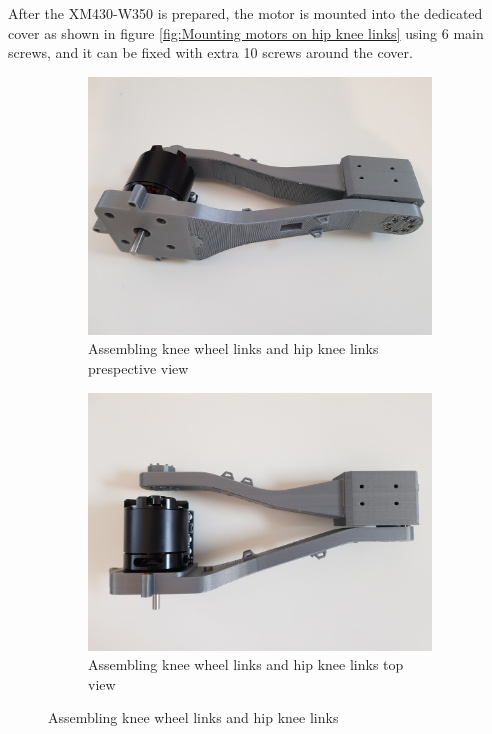 After the XM430-W350 is prepared, the motor is mounted into the dedicated cover as shown in figure \ref{fig:Mounting motors on hip knee links} using 6 main screws, and it can be fixed with extra 10 screws around the cover.
\begin{figure}[h]
	\centering
	\begin{subfigure}[t]{0.45\textwidth}
		\includegraphics[height=0.7\textwidth]{assembling_knee_wheel_links_and_hip_knee_links_1}
		\caption{Assembling knee wheel links and hip knee links	prespective view}
		\label{fig:assemblingkneewheellinksandhipkneelinksprespectiveview}
	\end{subfigure}
	\begin{subfigure}[t]{0.45\textwidth}
		\includegraphics[height=0.7\textwidth]{assembling_knee_wheel_links_and_hip_knee_links_2}
		\caption{Assembling knee wheel links and hip knee links	top view}
		\label{fig:assemblingkneewheellinksandhipkneelinkstopview}
	\end{subfigure}
	\caption{Assembling knee wheel links and hip knee links}
	\label{fig:Assembling knee wheel links and hip knee links}
\end{figure}

